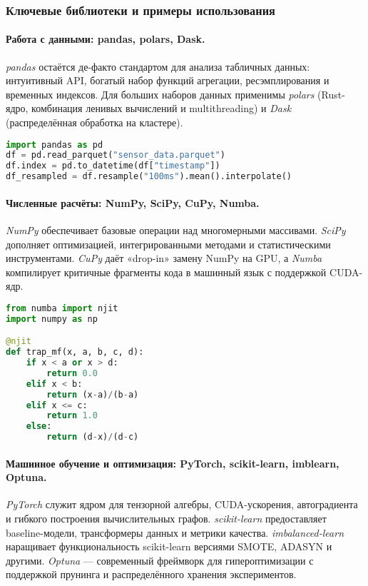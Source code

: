 \subsubsection{Ключевые библиотеки и примеры использования}

\paragraph{Работа с данными: pandas, polars, Dask.}
\bigskip
\emph{pandas} остаётся де-факто стандартом для анализа табличных данных:
интуитивный API, богатый набор функций агрегации, ресэмплирования
и временных индексов.  
Для больших наборов данных применимы \emph{polars} (Rust-ядро,
комбинация ленивых вычислений и multithreading) и \emph{Dask}
(распределённая обработка на кластере).

\begin{lstlisting}[language=Python, caption={Пример ресэмплирования временных рядов в pandas}, label={lst:pandas_resample}]
import pandas as pd
df = pd.read_parquet("sensor_data.parquet")
df.index = pd.to_datetime(df["timestamp"])
df_resampled = df.resample("100ms").mean().interpolate()
\end{lstlisting}

\paragraph{Численные расчёты: NumPy, SciPy, CuPy, Numba.}

\emph{NumPy} обеспечивает базовые операции над многомерными массивами.
\emph{SciPy} дополняет оптимизацией, интегрированными методами и
статистическими инструментами.  
\emph{CuPy} даёт «drop-in» замену NumPy на GPU,
а \emph{Numba} компилирует критичные фрагменты кода в машинный язык
с поддержкой CUDA-ядр.

\begin{lstlisting}[language=Python, caption={Numba-ускоренная функция для трапециевидной MF}, label={lst:numba_trap}]
from numba import njit
import numpy as np

@njit
def trap_mf(x, a, b, c, d):
    if x < a or x > d:
        return 0.0
    elif x < b:
        return (x-a)/(b-a)
    elif x <= c:
        return 1.0
    else:
        return (d-x)/(d-c)
\end{lstlisting}

\paragraph{Машинное обучение и оптимизация: PyTorch, scikit-learn, imblearn, Optuna.}
\indent \emph{PyTorch} служит ядром для тензорной алгебры, CUDA-ускорения,
автоградиента и гибкого построения вычислительных графов.
\emph{scikit-learn} предоставляет baseline-модели, трансформеры данных
и метрики качества.  
\emph{imbalanced-learn} наращивает функциональность scikit-learn 
версиями SMOTE, ADASYN и другими.  
\emph{Optuna} — современный фреймворк для гипероптимизации
с поддержкой прунинга и распределённого хранения экспериментов.


